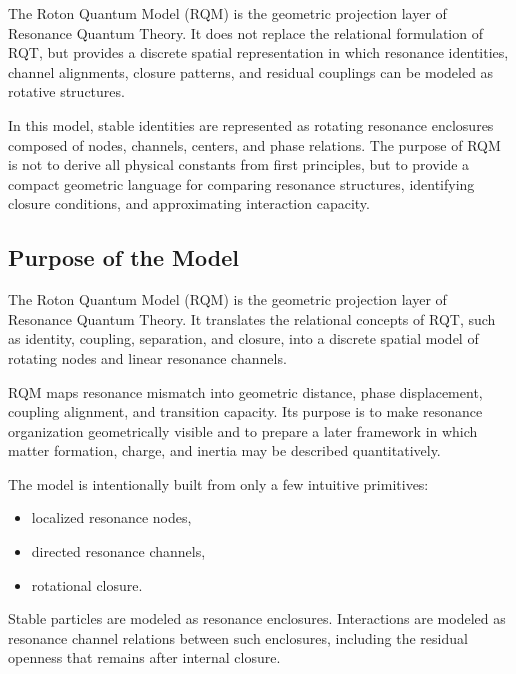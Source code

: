 \documentclass[11pt,a4paper]{article}
\begin{document}
The Roton Quantum Model (RQM) is the geometric projection layer of Resonance Quantum Theory. It does not replace the relational formulation of RQT, but provides a discrete spatial representation in which resonance identities, channel alignments, closure patterns, and residual couplings can be modeled as rotative structures.

In this model, stable identities are represented as rotating resonance enclosures composed of nodes, channels, centers, and phase relations. The purpose of RQM is not to derive all physical constants from first principles, but to provide a compact geometric language for comparing resonance structures, identifying closure conditions, and approximating interaction capacity.



\subsection{Purpose of the Model}

The Roton Quantum Model (RQM) is the geometric projection layer of Resonance Quantum Theory. It translates the relational concepts of RQT, such as identity, coupling, separation, and closure, into a discrete spatial model of rotating nodes and linear resonance channels.

RQM maps resonance mismatch into geometric distance, phase displacement, coupling alignment, and transition capacity. Its purpose is to make resonance organization geometrically visible and to prepare a later framework in which matter formation, charge, and inertia may be described quantitatively.

The model is intentionally built from only a few intuitive primitives:

\begin{itemize}
\item localized resonance nodes,
\item directed resonance channels,
\item rotational closure.
\end{itemize}

Stable particles are modeled as resonance enclosures. Interactions are modeled as resonance channel relations between such enclosures, including the residual openness that remains after internal closure.
\end{document}
